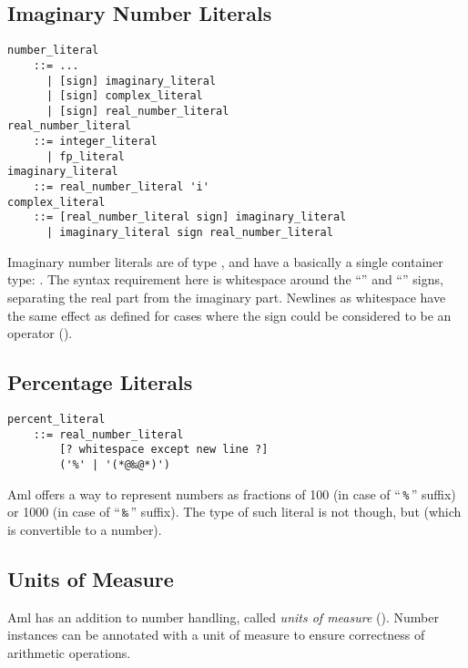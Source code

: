 \subsection{Imaginary Number Literals}
\label{sec:imaginaryliterals}

\syntax\begin{lstlisting}
number_literal
    ::= ...
      | [sign] imaginary_literal
      | [sign] complex_literal
      | [sign] real_number_literal
real_number_literal
    ::= integer_literal 
      | fp_literal
imaginary_literal 
    ::= real_number_literal 'i'
complex_literal
    ::= [real_number_literal sign] imaginary_literal
      | imaginary_literal sign real_number_literal
\end{lstlisting}

Imaginary number literals are of type , and have a basically a single container type: . The syntax requirement here is whitespace around the ``\code{+}'' and ``\code{-}'' signs, separating the real part from the imaginary part. Newlines as whitespace have the same effect as defined for cases where the sign could be considered to be an operator ().





\subsection{Percentage Literals}
\label{sec:percentageliterals}

\syntax\begin{lstlisting}[deletekeywords={new}]
percent_literal 
    ::= real_number_literal 
        [? whitespace except new line ?] 
        ('%' | '(*@‰@*)')
\end{lstlisting}

Aml offers a way to represent numbers as fractions of 100 (in case of ``\,\lstinline!%!\,'' suffix) or 1000 (in case of ``\,\texttt{‰}\,'' suffix). The type of such literal is not  though, but  (which is convertible to a number). 





\subsection{Units of Measure}
\label{sec:unitsofmeasuresyntax}

Aml has an addition to number handling, called {\em units of measure} (). Number instances can be annotated with a unit of measure to ensure correctness of arithmetic operations. 

